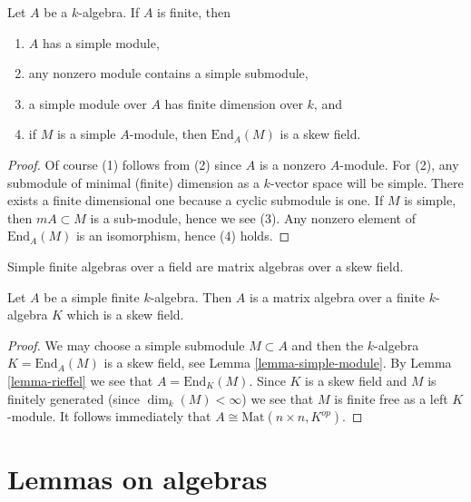 \begin{lemma}
\label{lemma-simple-module}
Let $A$ be a $k$-algebra. If $A$ is finite, then
\begin{enumerate}
\item $A$ has a simple module,
\item any nonzero module contains a simple submodule,
\item a simple module over $A$ has finite dimension over $k$, and
\item if $M$ is a simple $A$-module, then $\text{End}_A(M)$ is a
skew field.
\end{enumerate}
\end{lemma}

\begin{proof}
Of course (1) follows from (2) since $A$ is a nonzero $A$-module.
For (2), any submodule of minimal (finite) dimension as a $k$-vector
space will be simple. There exists a finite dimensional one
because a cyclic submodule is one. If $M$ is simple, then
$mA \subset M$ is a sub-module, hence we see (3). Any nonzero element
of $\text{End}_A(M)$ is an isomorphism, hence (4) holds.
\end{proof}

\begin{theorem}
\label{theorem-wedderburn}
\begin{slogan}
Simple finite algebras over a field are matrix algebras over a skew field.
\end{slogan}
Let $A$ be a simple finite $k$-algebra. Then $A$ is a matrix algebra over
a finite $k$-algebra $K$ which is a skew field.
\end{theorem}

\begin{proof}
We may choose a simple submodule $M \subset A$ and then
the $k$-algebra $K = \text{End}_A(M)$ is a skew field, see
Lemma \ref{lemma-simple-module}.
By
Lemma \ref{lemma-rieffel}
we see that $A = \text{End}_K(M)$. Since $K$ is a skew field and
$M$ is finitely generated (since $\dim_k(M) < \infty$) we see that
$M$ is finite free as a left $K$-module. It follows immediately that
$A \cong \text{Mat}(n \times n, K^{op})$.
\end{proof}






\section{Lemmas on algebras}
\label{section-lemmas}

